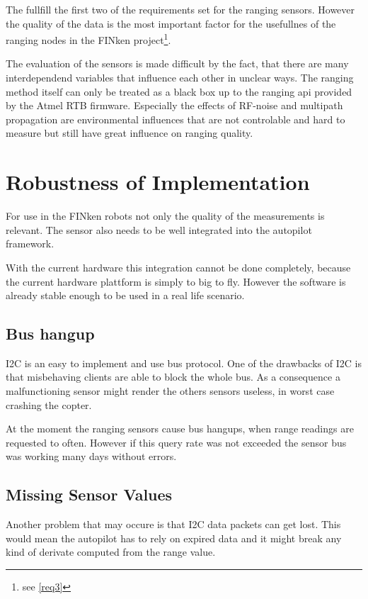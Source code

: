 The  fullfill the first two of the requirements set for the ranging sensors.
However the quality of the data is the most important factor for the usefullnes of the ranging nodes in the FINken project\footnote{see \autoref{req3}}.

The evaluation of the sensors is made difficult by the fact, that there are many interdependend variables that influence each other in unclear ways.
The ranging method itself can only be treated as a black box up to the ranging api provided by the Atmel RTB firmware.
Especially the effects of RF-noise and multipath propagation are environmental influences that are not controlable and hard to measure but still have great influence on ranging quality.

\section{Robustness of Implementation}

For use in the FINken robots not only the quality of the measurements is relevant.
The sensor also needs to be well integrated into the autopilot framework.

With the current hardware this integration cannot be done completely, because the current hardware plattform is simply to big to fly.
However the software is already stable enough to be used in a real life scenario.


\subsection{Bus hangup}
I2C is an easy to implement and use bus protocol.
One of the drawbacks of I2C is that misbehaving clients are able to block the whole bus.
As a consequence a malfunctioning sensor might render the others sensors useless, in worst case crashing the copter.

At the moment the ranging sensors cause bus hangups, when range readings are requested to often.
However if this query rate was not exceeded the sensor bus was working many days without errors.

\subsection{Missing Sensor Values}
Another problem that may occure is that I2C data packets can get lost.
This would mean the autopilot has to rely on expired data and it might break any kind of derivate computed from the range value.

